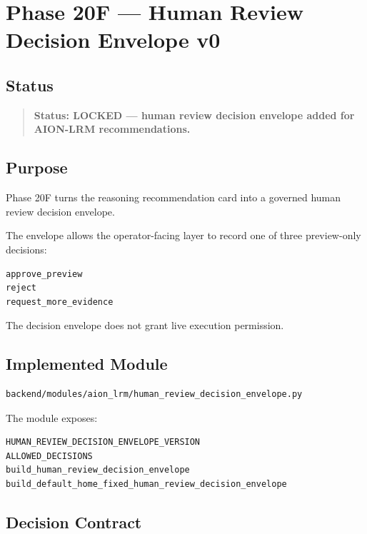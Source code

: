 \section{Phase 20F --- Human Review Decision Envelope v0}
\label{sec:phase20f-human-review-decision-envelope-v0}

\subsection{Status}

\begin{quote}
\textbf{Status: LOCKED --- human review decision envelope added for AION-LRM recommendations.}
\end{quote}

\subsection{Purpose}

Phase 20F turns the reasoning recommendation card into a governed human review decision envelope.

The envelope allows the operator-facing layer to record one of three preview-only decisions:

\begin{verbatim}
approve_preview
reject
request_more_evidence
\end{verbatim}

The decision envelope does not grant live execution permission.

\subsection{Implemented Module}

\begin{verbatim}
backend/modules/aion_lrm/human_review_decision_envelope.py
\end{verbatim}

The module exposes:

\begin{verbatim}
HUMAN_REVIEW_DECISION_ENVELOPE_VERSION
ALLOWED_DECISIONS
build_human_review_decision_envelope
build_default_home_fixed_human_review_decision_envelope
\end{verbatim}

\subsection{Decision Contract}

